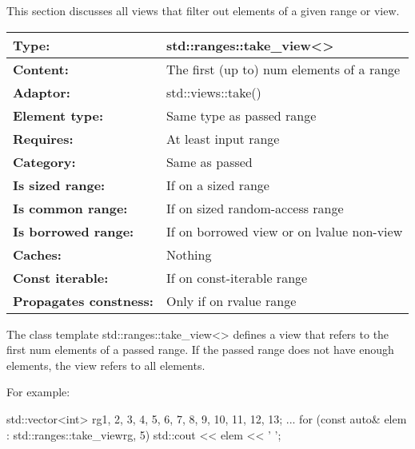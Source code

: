 

This section discusses all views that filter out elements of a given range or view.



\begin{longtable}[c]{|l|l|}
\hline
\textbf{Type:}                 & std::ranges::take\_view\textless{}\textgreater{} \\ \hline
\endfirsthead
%
\endhead
%
\textbf{Content:}              & The first (up to) num elements of a range        \\ \hline
\textbf{Adaptor:}              & std::views::take()                               \\ \hline
\textbf{Element type:}         & Same type as passed range                        \\ \hline
\textbf{Requires:}             & At least input range                             \\ \hline
\textbf{Category:}             & Same as passed                                   \\ \hline
\textbf{Is sized range:}       & If on a sized range                              \\ \hline
\textbf{Is common range:}      & If on sized random-access range                  \\ \hline
\textbf{Is borrowed range:}    & If on borrowed view or on lvalue non-view        \\ \hline
\textbf{Caches:}               & Nothing                                          \\ \hline
\textbf{Const iterable:}       & If on const-iterable range                       \\ \hline
\textbf{Propagates constness:} & Only if on rvalue range                          \\ \hline
\end{longtable}

The class template std::ranges::take\_view<> defines a view that refers to the first num elements of a passed range. If the passed range does not have enough elements, the view refers to all elements.

For example:

\begin{cpp}
std::vector<int> rg{1, 2, 3, 4, 5, 6, 7, 8, 9, 10, 11, 12, 13};
...
for (const auto& elem : std::ranges::take_view{rg, 5}) {
	std::cout << elem << ' ';
}
\end{cpp}


